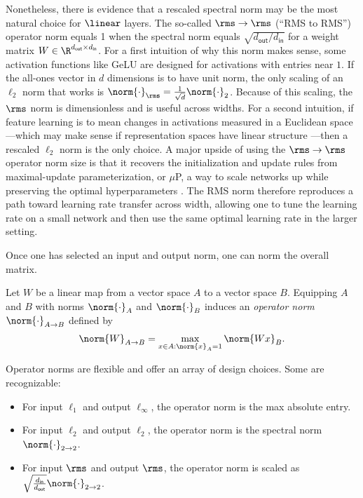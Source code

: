 Nonetheless, there is evidence that a rescaled spectral norm may be the most natural choice for $\linear$ layers. The so-called $\rms\to\rms$ (``RMS to RMS'') operator norm equals 1 when the spectral norm equals $\sqrt{d_\mathsf{out}/d_\mathsf{in}}$ for a weight matrix $W \in \R^{d_\mathsf{out} \times d_\mathsf{in}}$. For a first intuition of why this norm makes sense, some activation functions like GeLU \citep{hendrycks2023gaussianerrorlinearunits} are designed for activations with entries near $1$. If the all-ones vector in $d$ dimensions is to have unit norm, the only scaling of an $\ell_2$ norm that works is $\norm{\cdot}_\rms = \tfrac{1}{\sqrt{d}} \norm{\cdot}_2$. Because of this scaling, the $\rms$ norm is dimensionless and is useful across widths. For a second intuition, if feature learning is to mean changes in activations measured in a Euclidean space---which may make sense if representation spaces have linear structure \citep{park2024linearrepresentationhypothesisgeometry}---then a rescaled $\ell_2$ norm is the only choice. A major upside of using the $\rms\to\rms$ operator norm  size is that it recovers the initialization and update rules from maximal-update parameterization, or $\mu$P, a way to scale networks up while preserving the optimal hyperparameters \citep{yang2022tensorprogramsvtuning,spectral-condition}. The RMS norm therefore reproduces a path toward learning rate transfer across width, allowing one to tune the learning rate on a small network and then use the same optimal learning rate in the larger setting.

Once one has selected an input and output norm, one can norm the overall matrix.

\begin{definitionbox}
    Let $W$ be a linear map from a vector space $A$ to a vector space $B$. Equipping $A$ and $B$ with norms $\norm{\cdot}_A$ and $\norm{\cdot}_B$ induces an \textit{operator norm} $\norm{\cdot}_{A \to B}$ defined by \[
        \norm{W}_{A \to B} = \max_{x \in A : \norm{x}_A = 1} \norm{Wx}_B.
    \]
\end{definitionbox}

Operator norms are flexible and offer an array of design choices. Some are recognizable:
\begin{itemize}
    \item For input $\ell_1$ and output $\ell_\infty$, the operator norm is the max absolute entry.
    \item For input $\ell_2$ and output $\ell_2$, the operator norm is the spectral norm $\norm{\cdot}_{2 \to 2}$.
    \item For input $\rms$ and output $\rms$, the operator norm is scaled as $\sqrt{\tfrac{d_\mathsf{in}}{d_\mathsf{out}}} \norm{\cdot}_{2 \to 2}$.
\end{itemize}

